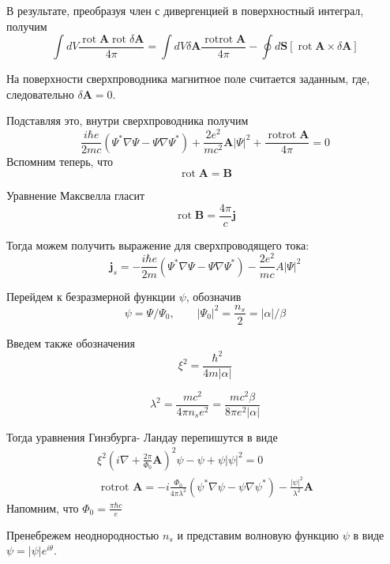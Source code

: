 \documentclass[a4paper,12pt]{article} %
\begin{document}
\begin{task}
В результате, 
преобразуя член с дивергенцией в поверхностный интеграл, 
получим
$$
\int d V \frac{\operatorname{rot} \mathbf{A} \operatorname{rot} \delta \mathbf{A}}{4 \pi}
=
\int d V \delta \mathbf{A} \frac{\operatorname{rotrot} \mathbf{A}}{4 \pi}
-
\oint d \mathbf{S}[\operatorname{rot} \mathbf{A} \times \delta \mathbf{A}]
$$



На поверхности сверхпроводника магнитное поле считается заданным, где, следовательно $\delta\mathbf{A}=0$.

Подставляя это, внутри сверхпроводника получим
$$
\frac{i \hbar e}{2 m c}
\left(\Psi^{*} \nabla \Psi
-
\Psi \nabla \Psi^{*}\right)
+
\frac{2 e^{2}}{m c^{2}} \mathbf{A}|\Psi|^{2}
+
\frac{\operatorname{rot rot} \mathbf{A}}{4 \pi}
=0
$$
Вспомним теперь, что
$$
\operatorname{rot} \mathbf{A}=\mathbf{B}
$$



Уравнение Максвелла гласит
$$
\operatorname{rot} \mathbf{B}=\frac{4 \pi}{c} \mathbf{j}
$$


Тогда можем получить выражение для сверхпроводящего тока:
$$
\mathbf{j}_{s}
=
-\frac{i \hbar e}{2 m}\left(\Psi^{*} \nabla \Psi-\Psi \nabla \Psi^{*}\right)
-
\frac{2 e^{2}}{m c} A|\Psi|^{2}
$$






Перейдем к безразмерной функции $\psi$, обозначив
$$
\psi=\Psi / \Psi_{0},
\qquad
\left|\Psi_{0}\right|^{2}
=
\frac{n_{s}}{2}
=
|\alpha| / \beta
$$



Введем также обозначения
$$
\xi^{2}=\frac{\hbar^{2}}{4 m|\alpha|}
$$

$$
\lambda^{2}
=
\frac{m c^{2}}{4 \pi n_{s} e^{2}}
=
\frac{m c^{2} \beta}{8 \pi e^{2}|\alpha|}
$$



Тогда уравнения Гинзбурга- Ландау перепишутся в виде
$$
\begin{array}{c}
	\xi^{2}\left(
	i \nabla
	+
	\frac{2 \pi}{\Phi_{0}} \mathbf{A}
	\right)^{2} \psi
	-\psi+\psi|\psi|^{2}=0 
	\\
	\text { rotrot } \mathbf{A}
	=
	-i \frac{\Phi_{0}}{4 \pi \lambda^{2}}\left(\psi^{*} \nabla \psi-\psi \nabla \psi^{*}\right)
	-
	\frac{|\psi|^{2}}{\lambda^{2}} \mathbf{A}
\end{array}
$$
Напомним, что $\Phi_{0}=\frac{\pi \hbar c}{e}$



Пренебрежем неоднородностью $n_{s}$ и представим волновую функцию $\psi$ в виде $\psi=|\psi| e^{i \theta} .$ 


\end{task}
\end{document}
